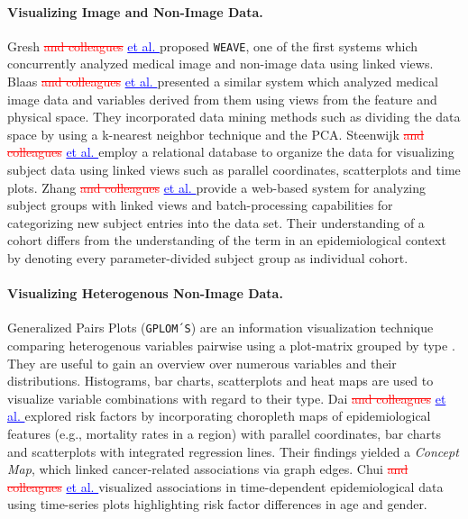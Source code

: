 \documentclass[journal]{style/vgtc} 			          %
\newcommand{\rem}[1]{\textcolor{red}{\sout{#1}}}
\newcommand{\add}[1]{\textcolor{blue}{\uline{#1}}}
\begin{document}
\paragraph{Visualizing Image and Non-Image Data. }
Gresh \rem{and colleagues} \add{et al. \cite{Gresh2000}} proposed \texttt{WEAVE}, one of the first systems which concurrently analyzed medical image and non-image data using linked views.
%
Blaas \rem{and colleagues} \add{et al. \cite{Blaas2007}} presented a similar system which analyzed medical image data and variables derived from them using views from the feature and physical space.
%
They incorporated data mining methods such as dividing the data space by using a k-nearest neighbor technique and the PCA.
%
Steenwijk \rem{and colleagues} \add{et al. \cite{Steenwijk2010}} employ a relational database to organize the data for visualizing subject data using linked views such as parallel coordinates, scatterplots and time plots.
%
Zhang \rem{and colleagues} \add{et al. \cite{Zhang2012}} provide a web-based system for analyzing subject groups with linked views and batch-processing capabilities for categorizing new subject entries into the data set.
%
Their understanding of a cohort differs from the understanding of the term in an epidemiological context by denoting every parameter-divided subject group as individual cohort.

\paragraph{Visualizing Heterogenous Non-Image Data.}
Generalized Pairs Plots (\texttt{GPLOM´S}) are an information visualization technique comparing heterogenous variables pairwise using a plot-matrix grouped by type \cite{Francois2013}.
%
They are useful to gain an overview over numerous variables and their distributions.
%
Histograms, bar charts, scatterplots and heat maps are used to visualize variable combinations with regard to their type.
%
%
%
%
Dai \rem{and colleagues} \add{et al. \cite{Dai2005}} explored risk factors by incorporating choropleth maps of epidemiological features (e.g., mortality rates in a region) with parallel coordinates, bar charts and scatterplots with integrated regression lines.
%
Their findings yielded a \emph{Concept Map}, which linked cancer-related associations via graph edges.
%
Chui \rem{and colleagues} \add{et al. \cite{Chui2011}} visualized associations in time-dependent epidemiological data using time-series plots highlighting risk factor differences in age and gender.
\end{document}
